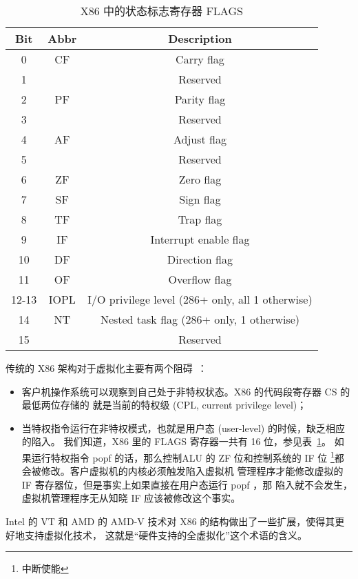 \begin{table}[h]
    \centering
    \caption{X86 中的状态标志寄存器 FLAGS}
    \begin{tabular}{||c c c||}
        \hline
        Bit & Abbr & Description \\
        \hline
        \hline
        0 & CF & Carry flag \\
        1 &  & Reserved \\
        2 & PF & Parity flag \\
        3 &  & Reserved \\
        4 & AF & Adjust flag \\
        5 &  & Reserved \\
        6 & ZF & Zero flag \\
        7 & SF & Sign flag \\
        8 & TF & Trap flag \\
        9 & IF & Interrupt enable flag \\
        10 & DF & Direction flag \\
        11 & OF & Overflow flag \\
        12-13 & IOPL & I/O privilege level (286+ only, all 1 otherwise) \\
        14 & NT & Nested task flag (286+ only, 1 otherwise) \\
        15 &  & Reserved \\
        \hline
    \end{tabular}
    \label{table:flags-x86}
\end{table}

传统的 X86 架构对于虚拟化主要有两个阻碍~\cite{adams2006comparison}：

\begin{itemize}
    \item 客户机操作系统可以观察到自己处于非特权状态。X86 的代码段寄存器 CS 的最低两位存储的
    就是当前的特权级 (CPL, current privilege level)；
    \item 当特权指令运行在非特权模式，也就是用户态 (user-level) 的时候，缺乏相应的陷入。
    我们知道，X86 里的 FLAGS 寄存器一共有 16 位，参见表~\ref{table:flags-x86}。
    如果运行特权指令 popf 的话，那么控制ALU 的 ZF 位和控制系统的 IF 位
    \footnote{中断使能}都会被修改。客户虚拟机的内核必须触发陷入虚拟机
    管理程序才能修改虚拟的 IF 寄存器位，但是事实上如果直接在用户态运行 popf ，那
    陷入就不会发生，虚拟机管理程序无从知晓 IF 应该被修改这个事实。
\end{itemize}

Intel 的 VT 和 AMD 的 AMD-V 技术对 X86 的结构做出了一些扩展，使得其更好地支持虚拟化技术，
这就是“硬件支持的全虚拟化”这个术语的含义。

